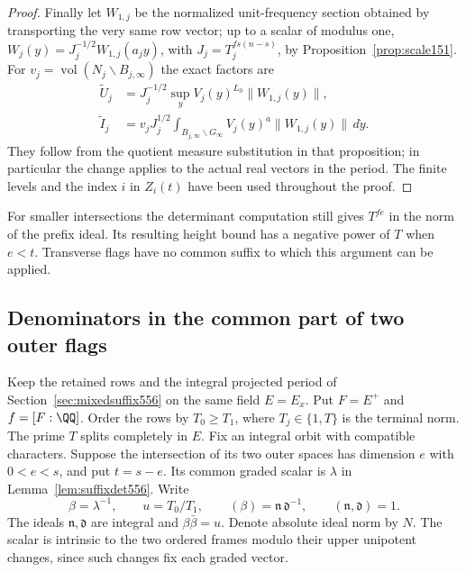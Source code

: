 \documentclass[a4paper,11pt]{article}
\theoremstyle{definition}
\theoremstyle{remark}
\numberwithin{equation}{section}
\begin{document}
\begin{proof}
Finally let \(W_{1,j}\) be the normalized unit-frequency
section obtained by transporting the very same row vector;
up to a scalar of modulus one,
\(W_j(y)=J_j^{-1/2}W_{1,j}(a_jy)\), with
\(J_j=T_j^{fs(n-s)}\), by Proposition~\ref{prop:scale151}.
For \(v_j=\operatorname{vol}(N_j\backslash B_{j,\infty})\)
the exact factors are
\[
 \begin{aligned}
 \widetilde U_j
     &=J_j^{-1/2}\sup_y V_j(y)^{L_0}\|W_{1,j}(y)\|,\\
 \widetilde I_j
     &=v_jJ_j^{1/2}\int_{B_{j,\infty}\backslash G_\infty}
                        V_j(y)^a\|W_{1,j}(y)\|\,d\dot y .
 \end{aligned}
\]
They follow from the quotient measure substitution in that
proposition; in particular the change applies to the actual
real vectors in the period. The finite levels and the index
\(i\) in \(Z_i(t)\) have been used throughout the proof.
\end{proof}

For smaller intersections the determinant computation still
gives \(T^{fe}\) in the norm of the prefix ideal. Its resulting
height bound has a negative power of \(T\) when \(e<t\).
Transverse flags have no common suffix to which this
argument can be applied.


\subsection{Denominators in the common part of two outer flags}
\label{sec:denomsuffix562}

Keep the retained rows and the integral projected period of
Section~\ref{sec:mixedsuffix556} on the same field \(E=E_x\).
Put \(F=E^+\) and \(f=[F:\QQ]\). Order the rows by
\(T_0\ge T_1\), where \(T_j\in\{1,T\}\) is the terminal norm.
The prime \(T\) splits completely in \(E\). Fix an integral
orbit with compatible characters. Suppose the intersection of
its two outer spaces has dimension \(e\) with \(0<e<s\),
and put \(t=s-e\). Its common graded scalar is \(\lambda\)
in Lemma~\ref{lem:suffixdet556}. Write
\[
  \beta=\lambda^{-1},\qquad
  u=T_0/T_1,\qquad
  (\beta)=\mathfrak n\,\mathfrak d^{-1},
           \qquad (\mathfrak n,\mathfrak d)=1 .
\]
The ideals \(\mathfrak n,\mathfrak d\) are integral and
\(\beta\bar\beta=u\). Denote absolute ideal norm by \(N\).
The scalar is intrinsic to the two ordered frames modulo their
upper unipotent changes, since such changes fix each graded
vector.
\end{document}
